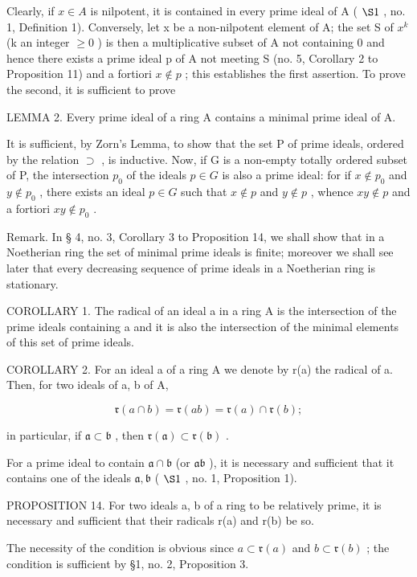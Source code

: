 Clearly, if \(x \in A\) is nilpotent, it is contained in every prime ideal of A ( \(\S 1\) , no. 1, Definition 1). Conversely, let x be a non-nilpotent element of A; the set S of \(x^{k}\) (k an integer \(\geqslant 0\) ) is then a multiplicative subset of A not containing 0 and hence there exists a prime ideal p of A not meeting S (no. 5, Corollary 2 to Proposition 11) and a fortiori \(x \notin p\) ; this establishes the first assertion. To prove the second, it is sufficient to prove

LEMMA 2. Every prime ideal of a ring A contains a minimal prime ideal of A.

It is sufficient, by Zorn's Lemma, to show that the set P of prime ideals, ordered by the relation \(\supset\) , is inductive. Now, if G is a non-empty totally ordered subset of P, the intersection \(p_{0}\) of the ideals \(p \in G\) is also a prime ideal: for if \(x \notin p_{0}\) and \(y \notin p_{0}\) , there exists an ideal \(p \in G\) such that \(x \notin p\) and \(y \notin p\) , whence \(xy \notin p\) and a fortiori \(xy \notin p_{0}\) .

Remark. In § 4, no. 3, Corollary 3 to Proposition 14, we shall show that in a Noetherian ring the set of minimal prime ideals is finite; moreover we shall see later that every decreasing sequence of prime ideals in a Noetherian ring is stationary.

COROLLARY 1. The radical of an ideal a in a ring A is the intersection of the prime ideals containing a and it is also the intersection of the minimal elements of this set of prime ideals.

COROLLARY 2. For an ideal a of a ring A we denote by r(a) the radical of a. Then, for two ideals of a, b of A,

\[
\mathfrak {r} (a \cap b) = \mathfrak {r} (a b) = \mathfrak {r} (a) \cap \mathfrak {r} (b);
\]

in particular, if \(\mathfrak{a} \subset \mathfrak{b}\) , then \(\mathfrak{r}(\mathfrak{a}) \subset \mathfrak{r}(\mathfrak{b})\) .

For a prime ideal to contain \(\mathfrak{a} \cap \mathfrak{b}\) (or \(\mathfrak{ab}\) ), it is necessary and sufficient that it contains one of the ideals \(\mathfrak{a}, \mathfrak{b}\) ( \(\S 1\) , no. 1, Proposition 1).

PROPOSITION 14. For two ideals a, b of a ring to be relatively prime, it is necessary and sufficient that their radicals r(a) and r(b) be so.

The necessity of the condition is obvious since \(a \subset \mathfrak{r}(a)\) and \(b \subset \mathfrak{r}(b)\) ; the condition is sufficient by §1, no. 2, Proposition 3.

